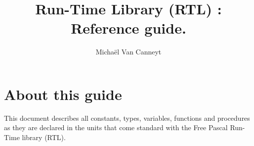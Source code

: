 %
%
%
%
%

\usepackage[utf8x]{inputenc}
\begin{latexonly}
  \ifpdf
  \fi
\end{latexonly}
%
%
\makeindex
\usepackage{tabularx}
%
%

\title{Run-Time Library (RTL) : \\ Reference guide.}
\label{rtl}

\author{Micha\"el Van Canneyt}
\maketitle
%
%
\makeatletter
\renewcommand*\l@section{\@dottedtocline{1}{1.5em}{2.7em}}
\renewcommand*\l@subsection{\@dottedtocline{2}{4.2em}{4em}}
\renewcommand*\l@subsubsection{\@dottedtocline{3}{8.2em}{5em}}
\makeatother
\tableofcontents
\newpage

\section*{About this guide}
This document describes all constants, types, variables, functions and
procedures as they are declared in the units that come standard with the 
Free Pascal Run-Time library (RTL).

